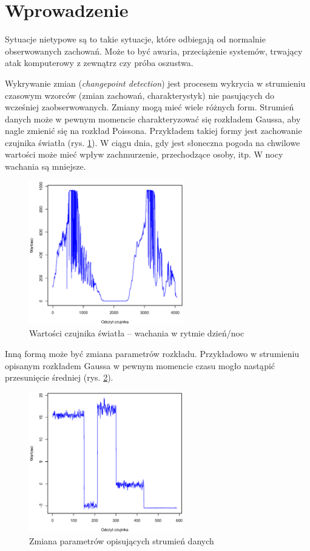 \section{Wprowadzenie}

Sytuacje nietypowe są to takie sytuacje,
które odbiegają od normalnie obserwowanych zachowań.
Może to być awaria, przeciążenie systemów,
trwający atak komputerowy z zewnątrz czy próba oszustwa.

Wykrywanie zmian (\textit{changepoint detection}) jest procesem
wykrycia w strumieniu czasowym wzorców (zmian zachowań, charakterystyk) nie pasujących do wcześniej zaobserwowanych.
Zmiany mogą mieć wiele różnych form.
Strumień danych może w pewnym momencie charakteryzować się rozkładem Gaussa,
aby nagle zmienić się na rozkład Poissona.
Przykładem takiej formy jest zachowanie czujnika światła (rys. \ref{fig:SignalDevice}).
W ciągu dnia, gdy jest słoneczna pogoda na chwilowe wartości może mieć wpływ zachmurzenie, przechodzące osoby, itp.
W nocy wachania są mniejsze.
\begin{figure}[htbp]
\centering
	\includegraphics[width=0.6\textwidth]{img/ch-2-device}
	\caption{Wartości czujnika światła -- wachania w rytmie dzień/noc}
  \label{fig:SignalDevice}
\end{figure}
Inną formą może być zmiana parametrów rozkładu.
Przykładowo w strumieniu opisanym rozkładem Gaussa
w pewnym momencie czasu mogło nastąpić przesunięcie średniej (rys. \ref{fig:SignalData}).
\begin{figure}[htbp]
\centering
	\includegraphics[width=0.6\textwidth]{img/ch-2-data}
	\caption{Zmiana parametrów opisujących strumień danych}
  \label{fig:SignalData}
\end{figure}

